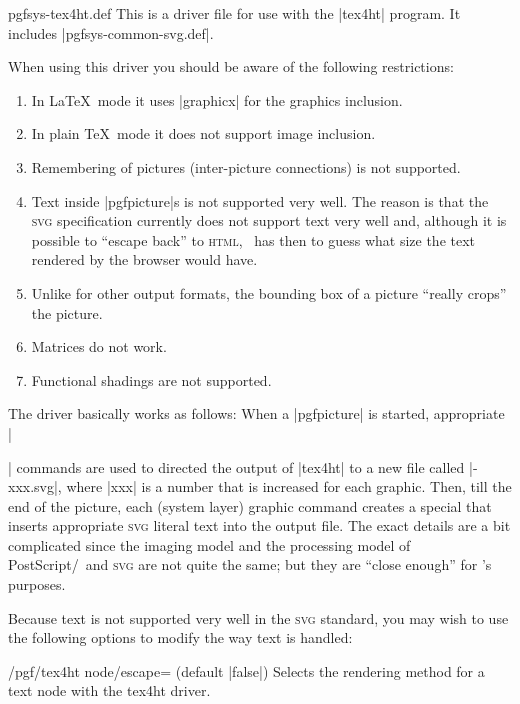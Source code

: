 \begin{filedescription}{pgfsys-tex4ht.def}
  This is a driver file for use with the |tex4ht| program. It includes
  |pgfsys-common-svg.def|.

  When using this driver you should be aware of the following
  restrictions:
  \begin{enumerate}
  \item
    In \LaTeX\ mode it uses |graphicx| for the graphics
    inclusion.
  \item
    In plain \TeX\ mode it does not support image inclusion.
  \item
    Remembering of pictures (inter-picture connections) is not
    supported.
  \item
    Text inside |pgfpicture|s is not supported very well. The reason
    is that the \textsc{svg} specification currently does not support
    text very well and, although it is  possible to ``escape
    back'' to \textsc{html}, \tikzname\ has then to guess what size the text
    rendered by the browser would have.
  \item
    Unlike for other output formats, the bounding box of a picture
    ``really crops'' the picture.
  \item
    Matrices do not work.
  \item
    Functional shadings are not supported.
  \end{enumerate}

  The driver basically works as follows: When a |{pgfpicture}| is
  started, appropriate |\special| commands are used to directed the
  output of |tex4ht| to a new file called |\jobname-xxx.svg|, where
  |xxx| is a number that is increased for each graphic. Then, till the
  end of the picture, each (system layer) graphic command creates a
  special that inserts appropriate \textsc{svg} literal text into the
  output file. The exact details are a bit complicated since the
  imaging model and the processing model of PostScript/\pdf\ and
  \textsc{svg} are not quite the same; but they are ``close enough''
  for \pgfname's purposes.

  Because text is not supported very well in the
  \textsc{svg} standard, you may wish to use the following options to
  modify the way text is handled:

  \begin{key}{/pgf/tex4ht node/escape= (default |false|)}
    Selects the rendering method for a text node with the tex4ht driver.


\end{key}
\end{filedescription}
